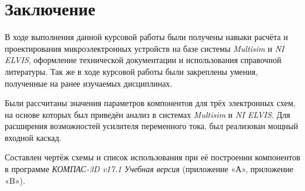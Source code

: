 \section{Заключение}

В ходе выполнения данной курсовой работы
были получены навыки расчёта и проектирования
микроэлектронных устройств на базе системы
\textit{Multisim} и \textit{NI ELVIS}, 
оформление технической документации и
использования справочной литературы.
Так же в ходе курсовой работы были
закреплены умения, полученные на ранее
изучаемых дисциплинах.

Были рассчитаны значения параметров компонентов
для трёх электронных схем, на основе которых
был приведён анализ в системах 
\textit{Multisim} и \textit{NI ELVIS}. 
Для расширения возможностей усилителя
переменного тока, был реализован мощный входной каскад.

Составлен чертёж схемы и список использования при
её построении компонентов в программе
\textit{КОМПАС-3D v17.1 Учебная версия} 
(приложение «А», приложение «B»). 
